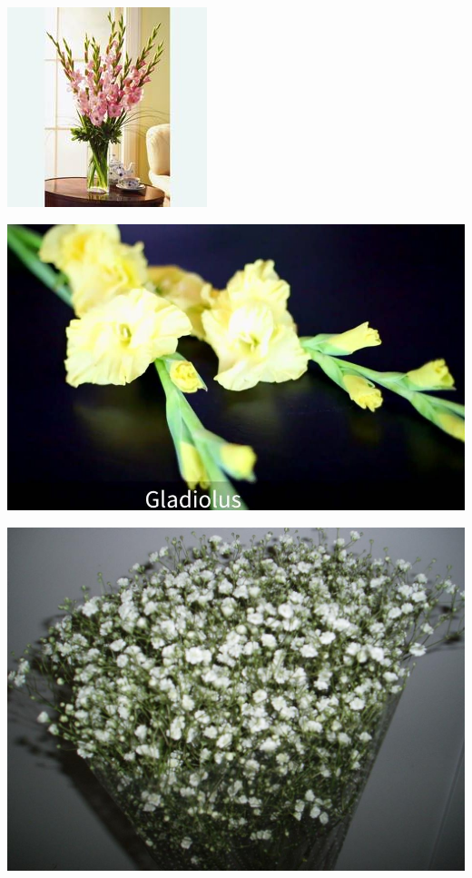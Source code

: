 \documentclass{article}
\begin{document}
\begin{center}
\includegraphics[height=0.925\paperheight]{../Gladiolous_Bouquet.jpg}
\end{center}
\newpage

\begin{center}
\includegraphics[height=0.925\paperheight]{../Gladiolus.jpg}
\end{center}
\newpage

\begin{center}
\includegraphics[height=0.925\paperheight]{../Gypsophilia.jpg}
\end{center}
\newpage
\end{document}
